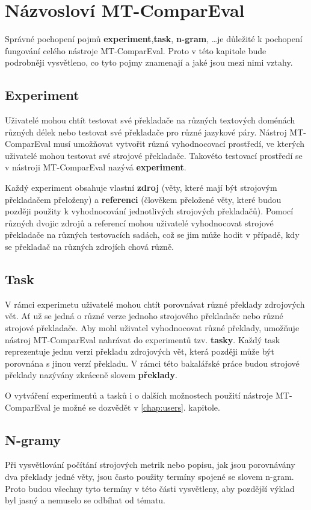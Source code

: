 \chapter{Názvosloví MT-ComparEval}
\label{chap:experiments}

Správné pochopení pojmů \textbf{experiment},\textbf{task}, \textbf{\mbox{n-gram}}, \dots je důležité k pochopení fungování celého nástroje MT-ComparEval.
Proto v této kapitole bude podrobněji vysvětleno,
  co tyto pojmy znamenají a jaké jsou mezi nimi vztahy.

\section{Experiment}
Uživatelé mohou chtít testovat své překladače na různých textových doménách různých délek
  nebo testovat své překladače pro různé jazykové páry.
Nástroj MT-ComparEval musí umožňovat vytvořit různá vyhodnocovací prostředí,
  ve kterých uživatelé mohou testovat své strojové překladače.
Takovéto testovací prostředí se v nástroji MT-ComparEval nazývá \textbf{experiment}.

Každý experiment obsahuje vlastní \textbf{zdroj} (věty, které mají být strojovým překladačem přeloženy) a
  \textbf{referenci} (člověkem přeložené věty, které budou později použity k vyhodnocování jednotlivých strojových překladačů).
Pomocí různých dvojic zdrojů a referencí mohou uživatelé vyhodnocovat strojové překladače na různých testovacích sadách,
  což se jim může hodit v případě,
  kdy se překladač na různých zdrojích chová různě.

\section{Task}
V rámci experimetu uživatelé mohou chtít porovnávat různé překlady zdrojových vět.
Ať už se jedná o různé verze jednoho strojového překladače nebo různé strojové překladače.
Aby mohl uživatel vyhodnocovat různé překlady,
  umožňuje nástroj MT-ComparEval nahrávat do experimentů tzv. \textbf{tasky}.
Každý task reprezentuje jednu verzi překladu zdrojových vět,
  která později může být porovnána s jinou verzí překladu.
V rámci této bakalářské práce budou strojové překlady nazývány zkráceně slovem \textbf{překlady}.

O vytváření experimentů a tasků i o dalších možnostech použití nástroje MT-ComparEval je možné se dozvědět v \ref{chap:users}. kapitole.

\section{N-gramy}
Při vysvětlování počítání strojových metrik
  nebo popisu, jak jsou porovnávány dva překlady jedné věty,
  jsou často použity termíny spojené se slovem \mbox{n-gram}.
Proto budou všechny tyto termíny v této části vysvětleny,
  aby pozdější výklad byl jasný a nemuselo se odbíhat od tématu.

